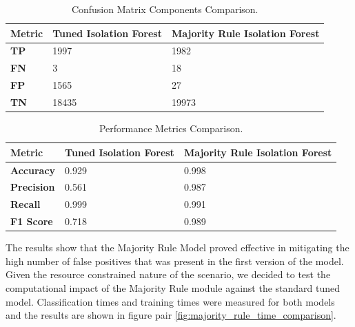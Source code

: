 \documentclass[futureinternet,article,submit,pdftex,moreauthors]{Definitions/mdpi}
\begin{document}
\begin{table}[H]
    \caption{Confusion Matrix Components Comparison.}\label{tab:majority_rule_confusionMatrix}
    \begin{tabularx}{\textwidth}{CCC}
    \toprule
    \textbf{Metric} & \textbf{Tuned Isolation Forest} & \textbf{Majority Rule Isolation Forest} \\
    \midrule
    \textbf{TP}  & 1997  & 1982 \\
    \textbf{FN}  & 3     & 18   \\
    \textbf{FP}  & 1565  & 27   \\
    \textbf{TN}  & 18435 & 19973 \\
    \bottomrule
    \end{tabularx}
\end{table}

\begin{table}[H]
    \caption{Performance Metrics Comparison.}\label{tab:majority_rule_performanceMetrics}
    \begin{tabularx}{\textwidth}{CCC}
    \toprule
    \textbf{Metric} & \textbf{Tuned Isolation Forest} & \textbf{Majority Rule Isolation Forest} \\
    \midrule
    \textbf{Accuracy}  & 0.929 & 0.998 \\
    \textbf{Precision} & 0.561 & 0.987 \\
    \textbf{Recall}    & 0.999 & 0.991 \\
    \textbf{F1 Score}  & 0.718 & 0.989 \\
    \bottomrule
    \end{tabularx}
\end{table}

The results show that the Majority Rule Model proved effective in mitigating the high number of false positives that was present in the first version of the model. 
Given the resource constrained nature of the scenario, we decided to test the computational impact of the Majority Rule module against the standard tuned model. 
Classification times and training times were measured for both models and the results are shown in figure pair \ref{fig:majority_rule_time_comparison}.
\end{document}
